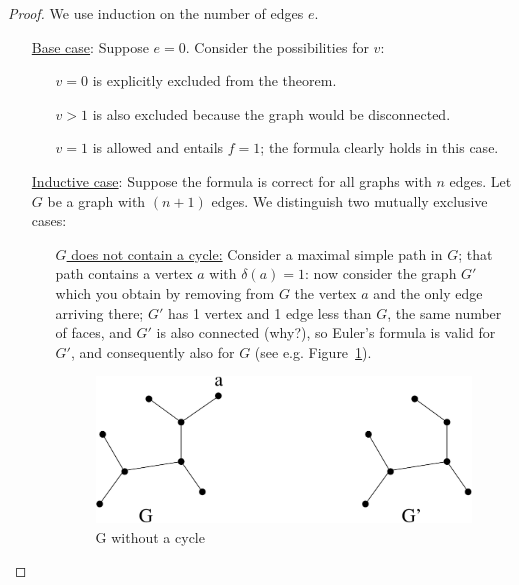 \begin{proof} We use induction on the number of edges $e$. 
\begin{itemize}
\item[\underline{Base case}:]
Suppose
$e=0$. Consider the possibilities for $v$: 
\begin{itemize}
\item[$v = 0$] is explicitly excluded from the theorem.
\item[$v > 1$] is also excluded because the graph would be disconnected. 
\item[$v=1$] is allowed and entails $f = 1$; the formula clearly holds in this case.
\end{itemize}


\item[\underline{Inductive case}:]
Suppose the formula is
correct for all graphs with $n$ edges. Let $G$ be a graph with $(n+1)$
edges. We distinguish two mutually exclusive cases:
\begin{itemize}
\item[\underline{$G$ does not contain a cycle:}]
Consider a maximal
simple path in $G$; that path contains a vertex $a$ with $\delta(a) =
1$: now consider the graph $G'$ which you obtain by removing from $G$
the vertex $a$ and the only edge arriving there; $G'$ has 1 vertex
and 1 edge less than $G$, the same number of faces, and $G'$ is also
connected (why?), so Euler's formula is valid for $G'$, and
consequently also for $G$ (see e.g. Figure~\ref{euler2}).\\
\begin{figure}[ht]
\begin{center}
\includegraphics[width=0.4\linewidth,keepaspectratio]{euler2}
\end{center}
\caption{G without a cycle \label{euler2}}
\end{figure}


\end{itemize}
\end{itemize}
\end{proof}
